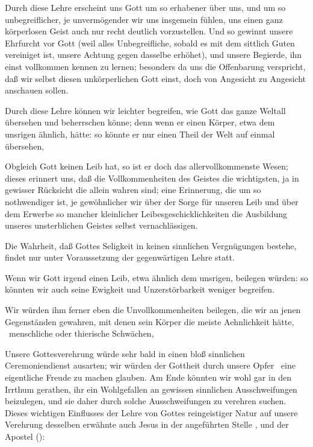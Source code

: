 \begin{aufza}
\item Durch diese Lehre erscheint uns Gott um so erhabener über uns, und um so unbegreiflicher, je unvermögender wir uns insgemein fühlen, uns einen ganz körperlosen Geist auch nur recht deutlich vorzustellen. Und so gewinnt unsere Ehrfurcht vor Gott (weil alles Unbegreifliche, sobald es mit dem sittlich Guten vereiniget ist, unsere Achtung gegen dasselbe erhöhet), und unsere Begierde, ihn einst vollkommen kennen zu lernen; besonders da uns die Offenbarung verspricht, daß wir selbst diesen unkörperlichen Gott einst, doch von Angesicht zu Angesicht anschauen sollen.
\item Durch diese Lehre können wir leichter begreifen, wie Gott das ganze Weltall übersehen und beherrschen könne; denn wenn er einen Körper, etwa dem unsrigen ähnlich, hätte: so könnte er nur einen Theil der Welt auf einmal übersehen, \usw\
\item Obgleich Gott keinen Leib hat, so ist er doch das allervollkommenste Wesen; dieses erinnert uns, daß die Vollkommenheiten des Geistes die wichtigsten, ja in gewisser Rücksicht die allein wahren sind; eine Erinnerung, die um so nothwendiger ist, je gewöhnlicher wir über der Sorge für unseren Leib und über dem Erwerbe so mancher kleinlicher Leibesgeschicklichkeiten die Ausbildung unseres unsterblichen Geistes selbst vernachlässigen.
\item Die Wahrheit, daß Gottes Seligkeit in keinen sinnlichen Vergnügungen bestehe, findet nur unter Voraussetzung der gegenwärtigen Lehre statt.~\RWSeitenw{159}
\item Wenn wir Gott irgend einen Leib, etwa ähnlich dem unsrigen, beilegen würden: so könnten wir auch seine Ewigkeit und Unzerstörbarkeit weniger begreifen.
\item Wir würden ihm ferner eben die Unvollkommenheiten beilegen, die wir an jenen Gegenständen gewahren, mit denen sein Körper die meiste Aehnlichkeit hätte, \zB\ menschliche oder thierische Schwächen, \udgl\ 
\item Unsere Gottesverehrung würde sehr bald in einen bloß sinnlichen Ceremoniendienst ausarten; wir würden der Gottheit durch unsere Opfer \udgl\  eine eigentliche Freude zu machen glauben. Am Ende könnten wir wohl gar in den Irrthum gerathen, ihr ein Wohlgefallen an gewissen sinnlichen Ausschweifungen beizulegen, und sie daher durch solche Ausschweifungen zu verehren suchen. Dieses wichtigen Einflusses der Lehre von Gottes reingeistiger Natur auf unsere Verehrung desselben erwähnte auch Jesus in der angeführten Stelle , und der Apostel ():  \usw\
\end{aufza}

